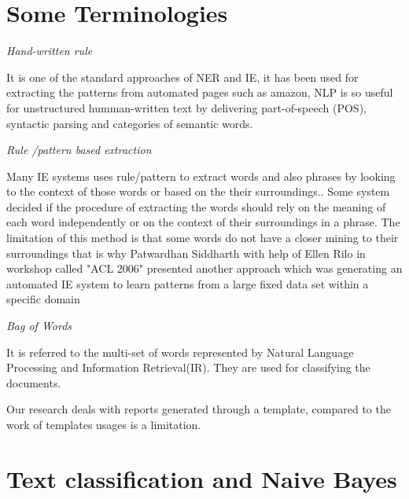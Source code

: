 \newpage

\section{Some Terminologies}

\textit{Hand-written rule}

It is one of the standard approaches of NER and IE, it has been used for extracting the patterns from automated pages such as amazon, NLP is so useful for unstructured humman-written text by delivering  part-of-speech (POS), syntactic parsing and categories of semantic words.

\textit{Rule /pattern based extraction}

Many IE systems uses rule/pattern to extract words and also phrases by looking to the context of those words or based on the their surroundings.\citep{califf2003bottom}. Some system decided if the procedure of extracting the words should rely on the meaning of each word independently or on the context of their surroundings in a phrase.
The limitation of this method is that some words do not have a closer mining to their surroundings that is why Patwardhan Siddharth with help of Ellen Rilo  in workshop called "ACL 2006" presented another approach which  was  generating an automated IE system to learn patterns from a large fixed data set  within a specific domain \citep{patwardhan2007effective} 

\textit{Bag of Words} 

It is referred to the multi-set of words represented by Natural Language Processing and Information Retrieval(IR). They are used  for classifying the documents.

Our research deals with reports generated through a template, compared to the work of  \citep{patwardhan2007effective} templates usages is a limitation.

\section{Text classification and Naive Bayes}


